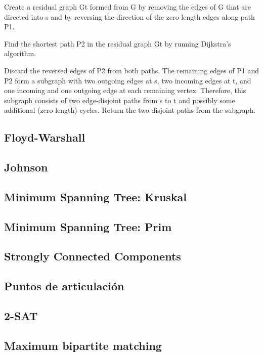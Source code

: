 \documentclass[10pt,letterpaper,twocolumn,twosided]{article}
\begin{document}
Create a residual graph Gt formed from G by removing the edges of G that are directed into s and by reversing 
the direction of the zero length edges along path P1.

Find the shortest path P2 in the residual graph Gt by running Dijkstra's algorithm.

Discard the reversed edges of P2 from both paths. The remaining edges of P1 and P2 form a subgraph with two 
outgoing edges at s, two incoming edges at t, and one incoming and one outgoing edge at each remaining vertex.
Therefore, this subgraph consists of two edge-disjoint paths from s to t and possibly some additional (zero-length)
cycles. Return the two disjoint paths from the subgraph.

\subsection{Floyd-Warshall}

\subsection{Johnson}

\subsection{Minimum Spanning Tree: Kruskal}

\subsection{Minimum Spanning Tree: Prim}

\subsection{Strongly Connected Components}

\subsection{Puntos de articulación}

\subsection{2-SAT}

\subsection{Maximum bipartite matching}
\end{document}
